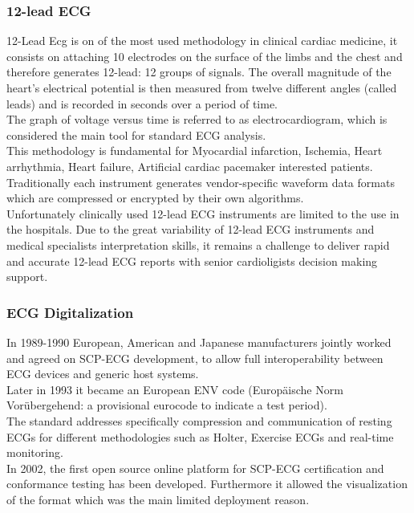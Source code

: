 \subsubsection{12-lead ECG}
12-Lead Ecg is on of the most used methodology in clinical cardiac medicine, it consists on attaching 10 electrodes on the surface of the limbs and the chest and therefore generates 12-lead: 12 groups of signals. The overall magnitude of the heart's electrical potential is then measured from twelve different angles (called leads) and is recorded in seconds over a period of time.\\
The graph of voltage versus time is referred to as electrocardiogram, which is considered the main tool for standard ECG analysis. \cite{electrocardiography_it} \cite{electrocardiography_en}\\
This methodology is fundamental for Myocardial infarction, Ischemia, Heart arrhythmia, Heart failure, Artificial cardiac pacemaker interested patients.
Traditionally each instrument generates vendor-specific waveform data formats which are compressed or encrypted by their own algorithms.\\
Unfortunately clinically used 12-lead ECG instruments are limited to the use in the hospitals. Due to the great variability of 12-lead ECG instruments and medical specialists interpretation skills, it remains a challenge to deliver rapid and accurate 12-lead ECG reports with senior cardioligists decision making support.\cite{Hsieh2012}
  


\subsubsection{ECG Digitalization}
In 1989-1990 European, American and Japanese manufacturers jointly worked and agreed on SCP-ECG development, to allow full interoperability between ECG devices and generic host systems.\\
Later in 1993 it became an European ENV code (Europäische Norm Vorübergehend: a provisional eurocode to indicate a test period).\\
The standard addresses specifically compression and communication of resting ECGs for different methodologies such as Holter, Exercise ECGs and real-time monitoring.\\
In 2002, the first open source online platform for SCP-ECG certification and conformance testing has been developed. Furthermore it allowed the visualization of the format which was the main limited deployment reason.\cite{Chronaki}\\

